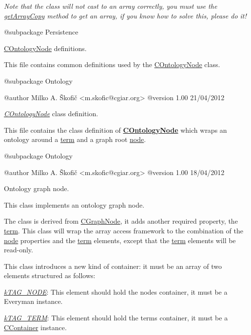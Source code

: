 {\itshape Note that the class will not cast to an array correctly, you must use the \hyperlink{}{get\-Array\-Copy} method to get an array, if you know how to solve this, please do it!}

\begin{DoxyVerb} @subpackage        Persistence\end{DoxyVerb}


\hyperlink{class_c_ontology_node}{C\-Ontology\-Node} definitions.

This file contains common definitions used by the \hyperlink{class_c_ontology_node}{C\-Ontology\-Node} class.

\begin{DoxyVerb} @subpackage        Ontology

 @author            Milko A. Škofič <m.skofic@cgiar.org>
 @version   1.00 21/04/2012\end{DoxyVerb}


{\itshape \hyperlink{class_c_ontology_node}{C\-Ontology\-Node}} class definition.

This file contains the class definition of {\bfseries \hyperlink{class_c_ontology_node}{C\-Ontology\-Node}} which wraps an ontology around a \hyperlink{class_c_ontology_term}{term} and a graph root \hyperlink{class_c_graph_node}{node}.

\begin{DoxyVerb} @subpackage        Ontology

 @author            Milko A. Škofič <m.skofic@cgiar.org>
 @version   1.00 18/04/2012\end{DoxyVerb}


Ontology graph node.

This class implements an ontology graph node.

The class is derived from \hyperlink{class_c_graph_node}{C\-Graph\-Node}, it adds another required property, the \hyperlink{}{term}. This class will wrap the array access framework to the combination of the \hyperlink{}{node} properties and the \hyperlink{}{term} elements, except that the \hyperlink{}{term} elements will be read-\/only.

This class introduces a new kind of container\-: it must be an array of two elements structured as follows\-:


\begin{DoxyItemize}
\item {\itshape \hyperlink{}{k\-T\-A\-G\-\_\-\-N\-O\-D\-E}}\-: This element should hold the nodes container, it must be a Everyman instance. 
\item {\itshape \hyperlink{}{k\-T\-A\-G\-\_\-\-T\-E\-R\-M}}\-: This element should hold the terms container, it must be a \hyperlink{class_c_container}{C\-Container} instance. 
\end{DoxyItemize}

